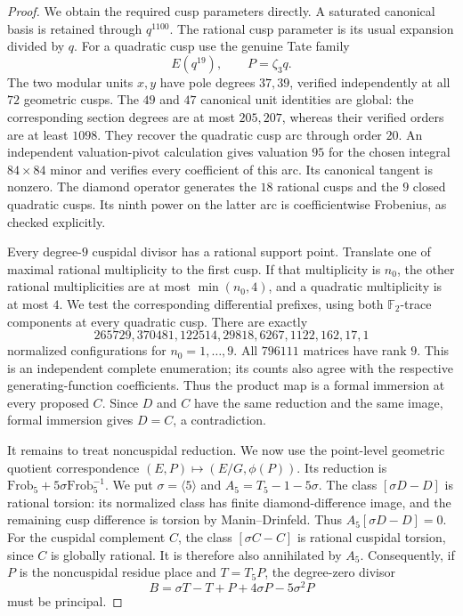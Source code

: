 \begin{proof}
We obtain the required cusp parameters directly.
A saturated canonical basis is retained through $q^{1100}$.
The rational cusp parameter is its usual expansion divided by
$q$. For a quadratic cusp use the genuine Tate family
\[
 E(q^{19}),\qquad P=\zeta_3q.
\]
The two modular units $x,y$ have pole degrees $37,39$,
verified independently at all $72$ geometric cusps.
The $49$ and $47$ canonical unit identities are global:
the corresponding section degrees are at most $205,207$,
whereas their verified orders are at least $1098$.
They recover the quadratic cusp arc through order $20$.
An independent valuation-pivot calculation gives valuation $95$
for the chosen integral $84\times84$ minor and verifies every
coefficient of this arc. Its canonical tangent is nonzero.
The diamond operator generates the $18$ rational cusps and the
$9$ closed quadratic cusps. Its ninth power on the latter arc
is coefficientwise Frobenius, as checked explicitly.

Every degree-$9$ cuspidal divisor has a rational support point.
Translate one of maximal rational multiplicity to the first cusp.
If that multiplicity is $n_0$, the other rational multiplicities
are at most $\min(n_0,4)$, and a quadratic multiplicity is at most
$4$. We test the corresponding differential prefixes, using both
$\mathbb F_2$-trace components at every quadratic cusp.
There are exactly
\[
 265729,370481,122514,29818,6267,1122,162,17,1
\]
normalized configurations for $n_0=1,\ldots,9$.
All $796111$ matrices have rank $9$.
This is an independent complete enumeration; its counts also
agree with the respective generating-function coefficients.
Thus the product map is a formal immersion at every proposed
$C$. Since $D$ and $C$ have the same reduction and the same image,
formal immersion gives $D=C$, a contradiction.

It remains to treat noncuspidal reduction.
We now use the point-level geometric quotient correspondence
$(E,P)\mapsto(E/G,\phi(P))$. Its reduction is
$\mathrm{Frob}_5+5\sigma\mathrm{Frob}_5^{-1}$.
We put
$\sigma=\langle5\rangle$ and $A_5=T_5-1-5\sigma$.
The class $[\sigma D-D]$ is rational torsion: its normalized
class has finite diamond-difference image, and the remaining
cusp difference is torsion by Manin--Drinfeld.
Thus $A_5[\sigma D-D]=0$.
For the cuspidal complement $C$, the class $[\sigma C-C]$
is rational cuspidal torsion, since $C$ is globally rational.
It is therefore also annihilated by $A_5$.
Consequently, if $P$ is the noncuspidal residue place and
$T=T_5P$, the degree-zero divisor
\[
 B=\sigma T-T+P+4\sigma P-5\sigma^2P
\]
must be principal.


\end{proof}
